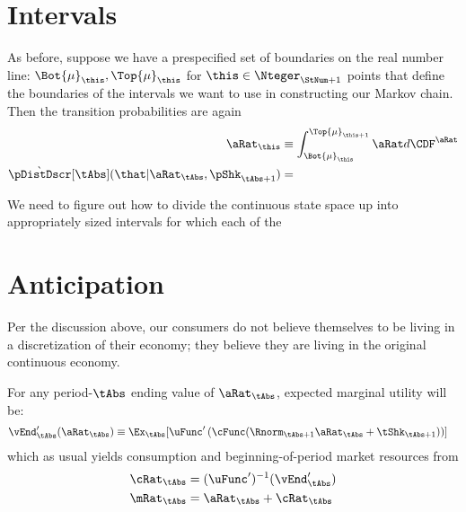 \documentclass[../BufferStockTheory.tex]{subfiles}\usepackage{ApndxSteadyState}
\begin{document}
  \section{Intervals}

  As before, suppose we have a prespecified set of boundaries on the real number line: $\Bot{\SetSub}_{\this},\Top{\SetSub}_{\this}$ for $\this \in \Nteger_{\StNum+1}$ points that define the boundaries of the intervals we want to use in constructing our Markov chain.  Then the transition probabilities are again
  \begin{equation}\begin{gathered}\begin{aligned}
    \point_{\this} & \equiv \int_{\Bot{\SetSub}_{\this}}^{\Top{\SetSub}_{\this+1}} \point d\CDF^{\point}
    \\ \Nxt{\pDistDscr}[\tAbs](\that|\point_{\tAbs},\pShk_{\tAbs+1}) &= 
  \end{aligned}\end{gathered}\end{equation}



  We need to figure out how to divide the continuous state space up into appropriately sized intervals for which each of the


  \section{Anticipation}

  Per the discussion above, our consumers do not believe themselves to be living in a discretization of their economy; they believe they are living in the original continuous economy.

  For any period-$\tAbs$ ending value of $\point_{\tAbs}$, expected marginal utility will be:
  \begin{equation}\begin{gathered}\begin{aligned}
    \vEnd^{\prime}_{\tAbs}(\point_{\tAbs}) & \equiv \Ex_{\tAbs}[\uFunc^{\prime}\left(\cFunc(\Rnorm_{\tAbs+1} \point_{\tAbs} + \tShk_{\tAbs+1})\right)]
  \end{aligned}\end{gathered}\end{equation}
  which as usual yields consumption and beginning-of-period market resources from
  \begin{equation}\begin{gathered}\begin{aligned}
    \cRat_{\tAbs} & = (\uFunc^{\prime})^{-1}(\vEnd^{\prime}_{\tAbs})
    \\ \mRat_{\tAbs} & = \point_{\tAbs}+\cRat_{\tAbs}
  \end{aligned}\end{gathered}\end{equation}
\end{document}
